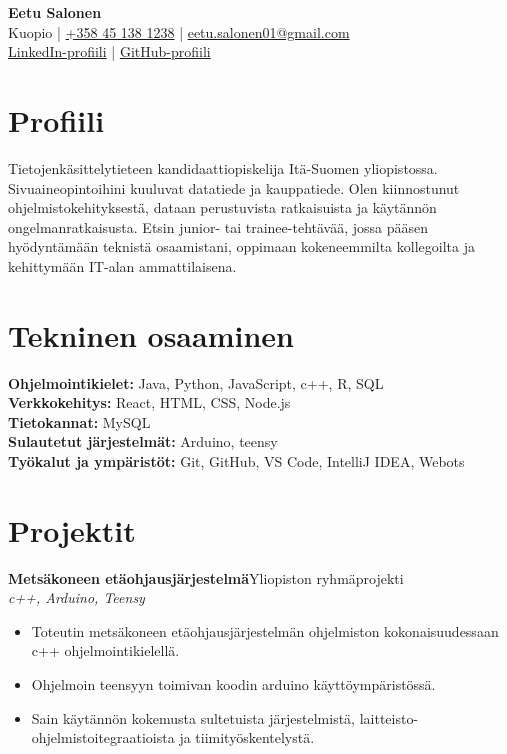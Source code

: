 \documentclass[a4paper,10pt]{article}
\newcommand{\cvItem}[1]{\item \small{#1}}
\newcommand{\cvProject}[3]{%
  \textbf{#1}\hfill {\small #2}\\
  \textit{\small #3}\\[-3pt]
}
\begin{document}
\begin{center}
  {\Huge\bfseries Eetu Salonen}\\[4pt]
  {\small Kuopio \;|\;
  \href{tel:+358451381238}{+358 45 138 1238} \;|\;
  \href{mailto:eetu.salonen01@gmail.com}{eetu.salonen01@gmail.com}}\\[2pt]
  {\small
  \href{https://www.linkedin.com/}{LinkedIn-profiili} \;|\;
  \href{https://github.com/}{GitHub-profiili}}
\end{center}

\section*{Profiili}
Tietojenkäsittelytieteen kandidaattiopiskelija Itä-Suomen yliopistossa.
Sivuaineopintoihini kuuluvat datatiede ja kauppatiede. Olen kiinnostunut
ohjelmistokehityksestä, dataan perustuvista ratkaisuista ja käytännön
ongelmanratkaisusta. Etsin junior- tai trainee-tehtävää, jossa pääsen
hyödyntämään teknistä osaamistani, oppimaan kokeneemmilta kollegoilta ja
kehittymään IT-alan ammattilaisena.

\section*{Tekninen osaaminen}
\small
\textbf{Ohjelmointikielet:} Java, Python, JavaScript, c++, R, SQL\\
\textbf{Verkkokehitys:} React, HTML, CSS, Node.js\\
\textbf{Tietokannat:} MySQL\\
\textbf{Sulautetut järjestelmät:} Arduino, teensy\\
\textbf{Työkalut ja ympäristöt:} Git, GitHub, VS Code, IntelliJ IDEA, Webots
\normalsize

\section*{Projektit}

\cvProject{Metsäkoneen etäohjausjärjestelmä}{Yliopiston ryhmäprojekti}{c++, Arduino, Teensy}
\begin{itemize}
  \cvItem{Toteutin metsäkoneen etäohjausjärjestelmän ohjelmiston kokonaisuudessaan c++ ohjelmointikielellä.}
  \cvItem{Ohjelmoin teensyyn toimivan koodin arduino käyttöympäristössä.}
  \cvItem{Sain käytännön kokemusta sultetuista järjestelmistä, laitteisto-ohjelmistoitegraatioista ja tiimityöskentelystä.}
\end{itemize}
\end{document}
